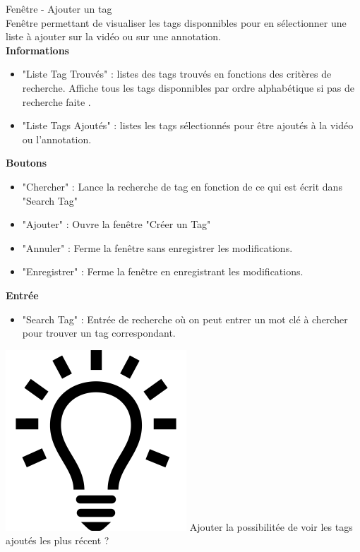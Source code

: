 \documentclass[11pt,french,a4paper]{report}
\begin{document}
\Large Fenêtre - Ajouter un tag\normalsize \\
    Fenêtre permettant de visualiser les tags disponnibles pour en sélectionner une liste à ajouter sur la vidéo
    ou sur une annotation. \\
\large \textbf{Informations}\normalsize
    \begin{itemize}[label=, leftmargin=*,parsep=0cm,itemsep=0cm,topsep=0cm]
        \item "Liste Tag Trouvés" : listes des tags trouvés en fonctions des critères de recherche.
        Affiche tous les tags disponnibles par ordre alphabétique si pas de recherche faite .
        \item "Liste Tags Ajoutés" : listes les tags sélectionnés pour être ajoutés à la vidéo ou l'annotation.
    \end{itemize}
\large \textbf{Boutons} \normalsize
    \begin{itemize}[label=, leftmargin=*,parsep=0cm,itemsep=0cm,topsep=0cm]
        \item "Chercher" : Lance la recherche de tag en fonction de ce qui est écrit dans "Search Tag"
        \item "Ajouter" : Ouvre la fenêtre  "Créer un Tag"
        \item "Annuler" : Ferme la fenêtre sans enregistrer les modifications.
        \item "Enregistrer" : Ferme la fenêtre en enregistrant les modifications.
    \end{itemize}
\large \textbf{Entrée}\normalsize
    \begin{itemize}[label=, leftmargin=*,parsep=0cm,itemsep=0cm,topsep=0cm]
        \item "Search Tag" : Entrée de recherche où on peut entrer un mot clé à chercher pour trouver un tag correspondant.
    \end{itemize}
    \includegraphics[scale=0.05]{../images/logo/logo_ampoule} Ajouter la possibilitée de voir les tags ajoutés 
            les plus récent ? \\ 
\end{document}
